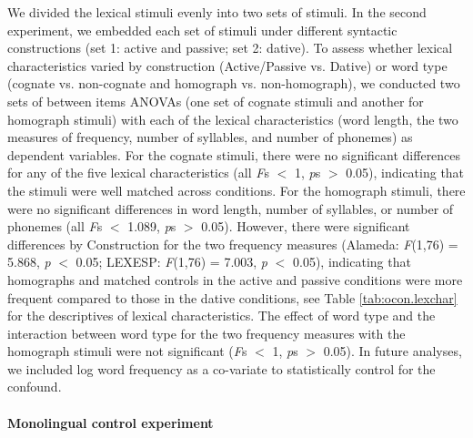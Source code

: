We divided the lexical stimuli evenly into two sets of stimuli. In the second experiment, we embedded each set of stimuli under different syntactic constructions (set 1: active and passive; set 2: dative). To assess whether lexical characteristics varied by construction (Active\slash Passive vs. Dative) or word type (cognate vs. non-cognate and homograph vs. non-homograph), we conducted two sets of between items ANOVAs (one set of cognate stimuli and another for homograph stimuli) with each of the lexical characteristics (word length, the two measures of frequency, number of syllables, and number of phonemes) as dependent variables. For the cognate stimuli, there were no significant differences for any of the five lexical characteristics (all \emph{F}s $<$ 1, \emph{p}s $>$ 0.05), indicating that the stimuli were well matched across conditions. For the homograph stimuli, there were no significant differences in word length, number of syllables, or number of phonemes (all \emph{F}s $<$ 1.089, \emph{p}s $>$ 0.05). However, there were significant differences by Construction for the two frequency measures (Alameda: \emph{F}(1,76) = 5.868, \emph{p} $<$ 0.05; LEXESP: \emph{F}(1,76) = 7.003, \emph{p} $<$ 0.05), indicating that homographs and matched controls in the active and passive conditions were more frequent compared to those in the dative conditions, see Table \ref{tab:ocon.lexchar} for the descriptives of lexical characteristics. The effect of word type and the interaction between word type for the two frequency measures with the homograph stimuli were not significant (\emph{F}s $<$ 1, \emph{p}s $>$ 0.05). In future analyses, we included log word frequency as a co-variate to statistically control for the confound. 

\paragraph{Monolingual control experiment}
\label{monolingualout-of-contextcontrolexperiment}

